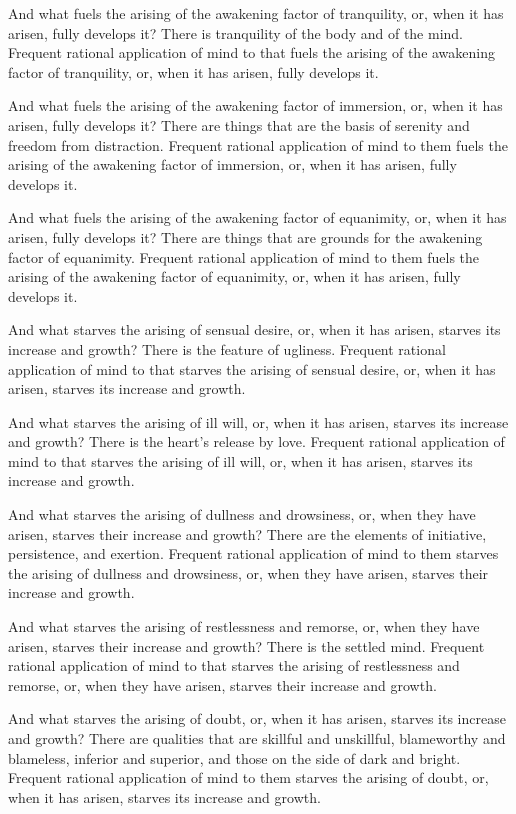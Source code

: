 \documentclass[12pt,openany]{book}%
\begin{document}
And what fuels the arising of the awakening factor of tranquility, or, when it has arisen, fully develops it? There is tranquility of the body and of the mind. Frequent rational application of mind to that fuels the arising of the awakening factor of tranquility, or, when it has arisen, fully develops it. 

And what fuels the arising of the awakening factor of immersion, or, when it has arisen, fully develops it? There are things that are the basis of serenity and freedom from distraction. Frequent rational application of mind to them fuels the arising of the awakening factor of immersion, or, when it has arisen, fully develops it. 

And what fuels the arising of the awakening factor of equanimity, or, when it has arisen, fully develops it? There are things that are grounds for the awakening factor of equanimity. Frequent rational application of mind to them fuels the arising of the awakening factor of equanimity, or, when it has arisen, fully develops it. 

And what starves the arising of sensual desire, or, when it has arisen, starves its increase and growth? There is the feature of ugliness. Frequent rational application of mind to that starves the arising of sensual desire, or, when it has arisen, starves its increase and growth. 

And what starves the arising of ill will, or, when it has arisen, starves its increase and growth? There is the heart’s release by love. Frequent rational application of mind to that starves the arising of ill will, or, when it has arisen, starves its increase and growth. 

And what starves the arising of dullness and drowsiness, or, when they have arisen, starves their increase and growth? There are the elements of initiative, persistence, and exertion. Frequent rational application of mind to them starves the arising of dullness and drowsiness, or, when they have arisen, starves their increase and growth. 

And what starves the arising of restlessness and remorse, or, when they have arisen, starves their increase and growth? There is the settled mind. Frequent rational application of mind to that starves the arising of restlessness and remorse, or, when they have arisen, starves their increase and growth. 

And what starves the arising of doubt, or, when it has arisen, starves its increase and growth? There are qualities that are skillful and unskillful, blameworthy and blameless, inferior and superior, and those on the side of dark and bright. Frequent rational application of mind to them starves the arising of doubt, or, when it has arisen, starves its increase and growth. 
\end{document}
